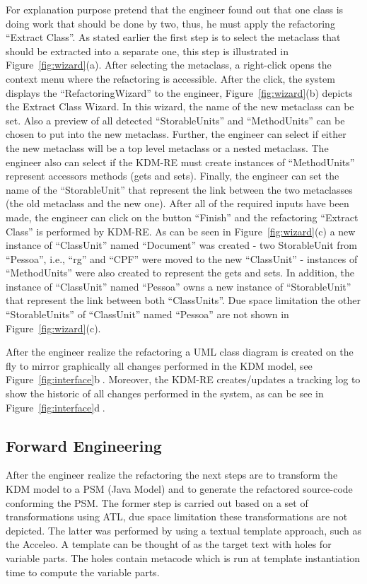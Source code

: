 For explanation purpose pretend that the engineer found out that one class is doing work that should be done by two, thus, he must apply the refactoring ``Extract Class''. As stated earlier the first step is to select the metaclass that should be extracted into a separate one, this step is illustrated in Figure~\ref{fig:wizard}(a). After selecting the metaclass, a right-click opens the context menu where the refactoring is accessible. After the click, the system displays the ``RefactoringWizard'' to the engineer, Figure~\ref{fig:wizard}(b) depicts the Extract Class Wizard. In this wizard, the name of the new metaclass can be set. Also a preview of all detected ``StorableUnits'' and ``MethodUnits'' can be chosen to put into the new metaclass. Further, the engineer can select if either the new metaclass will be a top level metaclass or a nested metaclass. The engineer also can select if the KDM-RE must create instances of ``MethodUnits'' represent accessors methods (gets and sets). Finally, the engineer can set the name of the ``StorableUnit'' that represent the link between the two metaclasses (the old metaclass and the new one). After all of the required inputs have been made, the engineer can click on the button ``Finish'' and the refactoring ``Extract Class'' is performed by KDM-RE. As can be seen in Figure~\ref{fig:wizard}(c) a new instance of ``ClassUnit'' named ``Document'' was created - two StorableUnit from ``Pessoa'', i.e., ``rg'' and ``CPF'' were moved to the new ``ClassUnit'' - instances of ``MethodUnits'' were also created to represent the gets and sets. In addition, the instance of ``ClassUnit'' named ``Pessoa'' owns a new instance of ``StorableUnit'' that represent the link between both ``ClassUnits''. Due space limitation the other ``StorableUnits'' of ``ClassUnit'' named ``Pessoa'' are not shown in Figure~\ref{fig:wizard}(c).

After the engineer realize the refactoring a UML class diagram is created on the fly to mirror graphically all changes performed in the KDM model, see Figure~\ref{fig:interface}\textcircled{b}. Moreover, the KDM-RE creates/updates a tracking log to show the historic of all changes performed in the system, as can be see in Figure~\ref{fig:interface}\textcircled{d}. 

\subsection{Forward Engineering}
After the engineer realize the refactoring the next steps are to transform the KDM model to a PSM (Java Model) and to generate the refactored source-code conforming the PSM. The former step is carried out based on a set of transformations using ATL, due space limitation these transformations are not depicted. The latter was performed by using a textual template approach, such as the Acceleo. A template can be thought of as the target text with holes for variable parts. The holes contain metacode which is run at template instantiation time to compute the variable parts.

